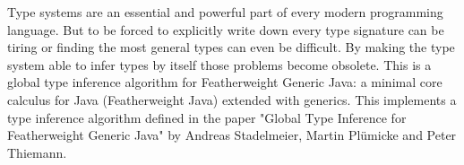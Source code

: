 Type systems are an essential and powerful part of every modern programming language.
But to be forced to explicitly write down every type signature can be tiring or
finding the most general types can even be difficult.
By making the type system able to infer types by itself those problems become obsolete.
This is a global type inference algorithm for Featherweight Generic Java: a minimal core calculus for Java (Featherweight Java) extended with generics.
This implements a type inference algorithm defined in the paper "Global Type Inference for Featherweight Generic
Java" by Andreas Stadelmeier, Martin Plümicke and Peter Thiemann.
